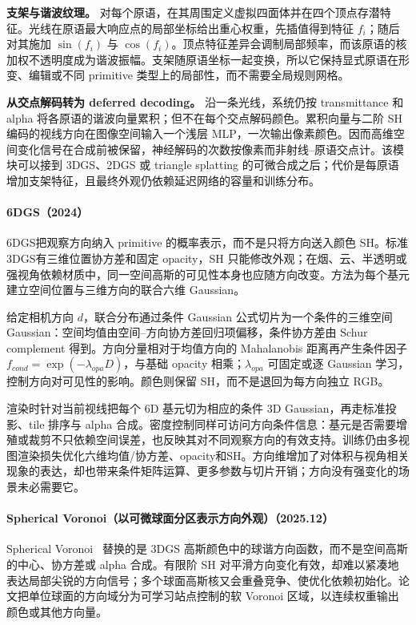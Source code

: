 \textbf{支架与谐波纹理。} 对每个原语，在其周围定义虚拟四面体并在四个顶点存潜特征。光线在原语最大响应点的局部坐标给出重心权重，先插值得到特征 $f_i$；随后对其施加 $\sin(f_i)$ 与 $\cos(f_i)$。顶点特征差异会调制局部频率，而该原语的核加权不透明度成为谐波振幅。支架随原语坐标一起变换，所以它保持显式原语在形变、编辑或不同 primitive 类型上的局部性，而不需要全局规则网格。

\textbf{从交点解码转为 deferred decoding。} 沿一条光线，系统仍按 transmittance 和 alpha 将各原语的谐波向量累积；但不在每个交点解码颜色。累积向量与二阶 SH 编码的视线方向在图像空间输入一个浅层 MLP，一次输出像素颜色。因而高维空间变化信号在合成前被保留，神经解码的次数按像素而非射线--原语交点计。该模块可以接到 3DGS、2DGS 或 triangle splatting 的可微合成之后；代价是每原语增加支架特征，且最终外观仍依赖延迟网络的容量和训练分布。

\paragraph{6DGS（2024）\cite{2410_04974}}
6DGS把观察方向纳入 primitive 的概率表示，而不是只将方向送入颜色 SH。标准 3DGS有三维位置协方差和固定 opacity，SH 只能修改外观；在烟、云、半透明或强视角依赖材质中，同一空间高斯的可见性本身也应随方向改变。方法为每个基元建立空间位置与三维方向的联合六维 Gaussian。

给定相机方向 $d$，联合分布通过条件 Gaussian 公式切片为一个条件的三维空间 Gaussian：空间均值由空间--方向协方差回归项偏移，条件协方差由 Schur complement 得到。方向分量相对于均值方向的 Mahalanobis 距离再产生条件因子 $f_{cond}=\exp(-\lambda_{opa}D)$，与基础 opacity 相乘；$\lambda_{opa}$ 可固定或逐 Gaussian 学习，控制方向对可见性的影响。颜色则保留 SH，而不是退回为每方向独立 RGB。

渲染时针对当前视线把每个 6D 基元切为相应的条件 3D Gaussian，再走标准投影、tile 排序与 alpha 合成。密度控制同样可访问方向条件信息：基元是否需要增殖或裁剪不只依赖空间误差，也反映其对不同观察方向的有效支持。训练仍由多视图渲染损失优化六维均值/协方差、opacity和SH。方向维增加了对体积与视角相关现象的表达，却也带来条件矩阵运算、更多参数与切片开销；方向没有强变化的场景未必需要它。

\paragraph{Spherical Voronoi（以可微球面分区表示方向外观）（2025.12）}
Spherical Voronoi~\cite{2512_14180} 替换的是 3DGS 高斯颜色中的球谐方向函数，而不是空间高斯的中心、协方差或 alpha 合成。有限阶 SH 对平滑方向变化有效，却难以紧凑地表达局部尖锐的方向信号；多个球面高斯核又会重叠竞争、使优化依赖初始化。论文把单位球面的方向域分为可学习站点控制的软 Voronoi 区域，以连续权重输出颜色或其他方向量。

